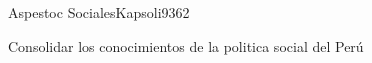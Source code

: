 \begin{syllabus}
\begin{unit}{Aspestoc Sociales}{Kapsoli93}{6}{2}
\begin{unitgoals}
      \item Consolidar los conocimientos de la politica social del Perú
\end{unitgoals}
\end{unit}



\begin{coursebibliography}
\end{coursebibliography}

\end{syllabus}
